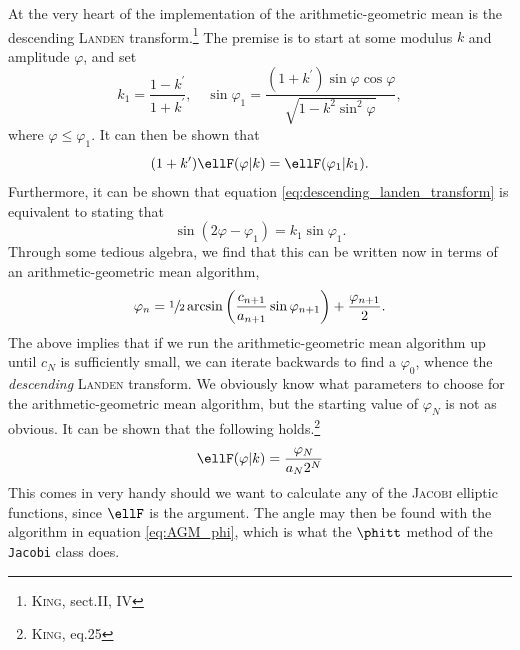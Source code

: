 At the very heart of the implementation of the arithmetic-geometric mean is the descending \textsc{Landen} transform.\footnote{\cite{king1924direct} \textsc{King}, sect.II, IV}
The premise is to start at some modulus $k$ and amplitude $\varphi$, and set
\begin{equation}\label{eq:descending_landen_transform}
k_1 = \frac{1 - k^{\prime}}{1 + k^{\prime}}, \quad \sin{\varphi_1} = \frac{(1 + k^{\prime}) \sin{\varphi} \cos{\varphi}}{\sqrt{1 - k^2 \sin^2{\varphi}}},
\end{equation}
where $\varphi \leq \varphi_1$.
It can then be shown that
\[
(1 + k^{\prime}) \ellF(\varphi \vert k) = \ellF(\varphi_1 \vert k_1).
\]
Furthermore, it can be shown that equation \eqref{eq:descending_landen_transform} is equivalent to stating that
\[
\sin{( 2\varphi - \varphi_1 )} = k_1 \sin{\varphi_1}.
\]
Through some tedious algebra, we find that this can be written now in terms of an arithmetic-geometric mean algorithm,
\begin{equation}\label{eq:AGM_phi}
\varphi_n = \sfrac{1}{2} \arcsin{\left( \frac{c_{n+1}}{a_{n+1}} \sin{\varphi_{n+1}} \right)} + \frac{\varphi_{n+1}}{2}.
\end{equation}
The above implies that if we run the arithmetic-geometric mean algorithm up until $c_N$ is sufficiently small, we can iterate backwards to find a $\varphi_0$, whence the \emph{descending} \textsc{Landen} transform.
We obviously know what parameters to choose for the arithmetic-geometric mean algorithm, but the starting value of $\varphi_N$ is not as obvious.
It can be shown that the following holds.\footnote{\cite{king1924direct} \textsc{King}, eq.25}
\begin{equation}\label{eq:AGM_ellF}
\ellF(\varphi \vert k) = \frac{\varphi_N}{a_N 2^N}
\end{equation}
This comes in very handy should we want to calculate any of the \textsc{Jacobi} elliptic functions, since $\ellF$ is the argument.
The angle may then be found with the algorithm in equation \eqref{eq:AGM_phi}, which is what the $\phitt$ method of the \texttt{Jacobi} class does.
